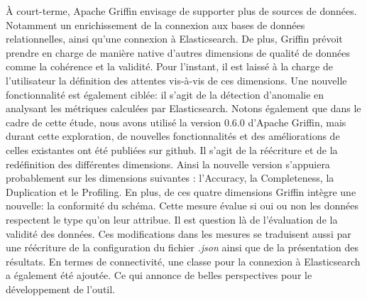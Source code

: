 \`A court-terme, Apache Griffin envisage de supporter plus de sources de donn\'ees. Notamment un enrichissement de la connexion aux bases de donn\'ees relationnelles, ainsi qu'une connexion \`a Elasticsearch. De plus, Griffin pr\'evoit prendre en charge de mani\`ere native d'autres dimensions de qualit\'e de donn\'ees comme la coh\'erence et la validit\'e. Pour l'instant, il est laiss\'e \`a la charge de l'utilisateur la d\'efinition des attentes vis-\`a-vis de ces dimensions. Une nouvelle fonctionnalit\'e est \'egalement cibl\'ee:  il s'agit de la d\'etection d'anomalie en analysant les m\'etriques calcul\'ees par Elasticsearch. Notons \'egalement que dans le cadre de cette \'etude, nous avons utilis\'e la version 0.6.0 d'Apache Griffin, mais durant cette exploration, de nouvelles fonctionnalités et des am\'eliorations de celles existantes ont \'et\'e publi\'ees sur github. Il s'agit de la réécriture et de la red\'efinition des diff\'erentes dimensions. Ainsi la nouvelle version s'appuiera probablement sur les dimensions suivantes :  l'Accuracy, la Completeness, la Duplication et le Profiling. En plus, de ces quatre dimensions Griffin intègre une nouvelle: la conformit\'e du sch\'ema. Cette mesure \'evalue si oui ou non les donn\'ees respectent le type qu'on leur attribue. Il est question l\`a de l'\'evaluation de la validit\'e des donn\'ees.  Ces modifications dans les mesures se traduisent aussi par une réécriture de la configuration du fichier \textit{.json} ainsi que de la pr\'esentation des r\'esultats. En termes de connectivit\'e, une classe pour la connexion \`a Elasticsearch a \'egalement \'et\'e ajout\'ee. Ce qui annonce de belles perspectives pour le d\'eveloppement de l'outil. 
\\


